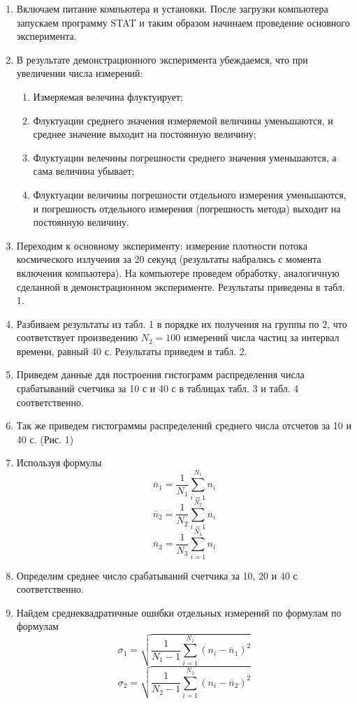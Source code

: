 \documentclass[a4paper, 10pt]{article}%
\begin{document}
\begin{enumerate}
\item Включаем питание компьютера и установки. После загрузки компьютера запускаем программу STAT и таким образом начинаем проведение основного эксперимента. 
\item В результате демонстрационного эксперимента убеждаемся, что при увеличении числа измерений:
\begin{enumerate}
\item Измеряемая велечина флуктуирует;
\item Флуктуации среднего значения измеряемой величины уменьшаются, и среднее значение выходит на постоянную величину;
\item Флуктуации велечины погрешности среднего значения уменьшаются, а сама величина убывает;
\item Флуктуации величины погрешности отдельного измерения уменьшаются, и погрешность отдельного измерения (погрешность метода) выходит на постоянную величину.
\end{enumerate}
\item Переходим к основному эксперименту: измерение плотности потока космического излучения за 20 секунд (результаты набрались с момента включения компьютера). На компьютере проведем обработку, аналогичную сделанной в демонстрационном эксперименте. Результаты приведены в табл. 1.
\item Разбиваем результаты из табл. 1 в порядке их получения на группы по 2, что соответствует произведению $N_2 = 100$ измерений числа частиц за интервал времени, равный 40 с. Результаты приведем в табл. 2.
\item Приведем данные ддя построения гистограмм распределения числа срабатываний счетчика за 10 с и 40 с в таблицах табл. 3 и табл. 4 соответственно. 
\item Так же приведем гистограммы распределений среднего числа отсчетов за 10 и 40 с. (Рис. 1) 
\item Используя формулы
\[ \overline{n}_1 = \dfrac{1}{N_1} \sum_{i = 1}^{N_1} {n_i} 
 \]
 \[ \overline{n}_2 = \dfrac{1}{N_2} \sum_{i = 1}^{N_2} {n_i} 
 \]
 \[ \overline{n}_3 = \dfrac{1}{N_3} \sum_{i = 1}^{N_3} {n_i} 
 \] 
\item Определим среднее число срабатываний счетчика за 10, 20 и 40 с соответственно.
\item Найдем среднеквадратичные ошибки отдельных измерений по формулам по формулам
\[ \sigma_1 = \sqrt{\dfrac{1}{N_1 - 1} \sum_{i = 1}^{N_1} {(n_i - \overline{n}_1)^2} }
 \]
 \[ \sigma_2 = \sqrt{\dfrac{1}{N_2 - 1} \sum_{i = 1}^{N_2} {(n_i - \overline{n}_2)^2} }
\]
\end{enumerate}
\end{document}

